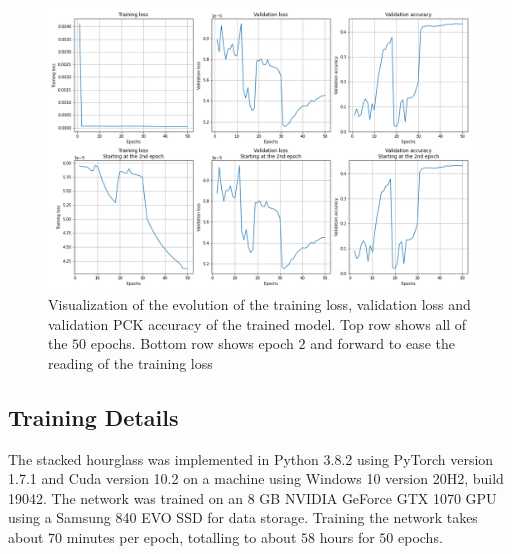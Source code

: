 \documentclass[./main.tex]{subfiles}
\begin{document}
\begin{figure}[t]
    \centering
    \includegraphics[width = \textwidth]{entities/results.png}
    \caption{Visualization of the evolution of the training loss, validation loss and validation PCK accuracy of the trained model. Top row shows all of the $50$ epochs. Bottom row shows epoch $2$ and forward to ease the reading of the training loss}
    \label{fig:results}
\end{figure}


\subsection{Training Details}
The stacked hourglass was implemented in Python 3.8.2 using PyTorch version 1.7.1 and Cuda version 10.2 on a machine using Windows 10 version 20H2, build 19042. The network was trained on an 8 GB NVIDIA GeForce GTX 1070 GPU using a Samsung 840 EVO SSD for data storage. Training the network takes about $70$ minutes per epoch, totalling to about $58$ hours for $50$ epochs.
\end{document}
